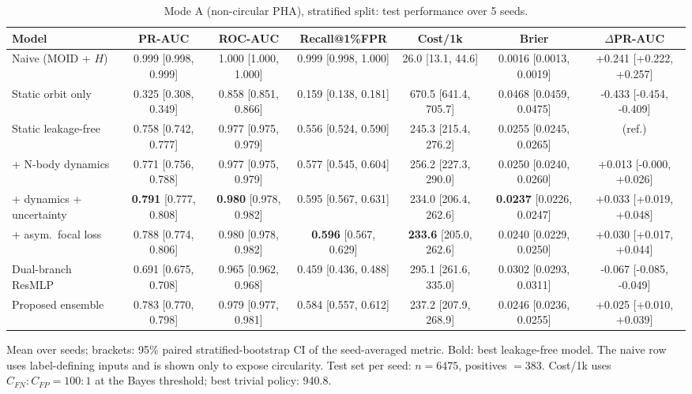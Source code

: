 \begin{table}[t]
\centering
\small
\caption{Mode A (non-circular PHA), stratified split: test performance over 5 seeds.}
\label{tab:pha_stratified_all}
\begin{tabular}{lcccccc}
\toprule
Model & PR-AUC & ROC-AUC & Recall@1\%FPR & Cost/1k & Brier & $\Delta$PR-AUC \\
\midrule
Naive (MOID + $H$) & 0.999 \scriptsize{[0.998, 0.999]} & 1.000 \scriptsize{[1.000, 1.000]} & 0.999 \scriptsize{[0.998, 1.000]} & 26.0 \scriptsize{[13.1, 44.6]} & 0.0016 \scriptsize{[0.0013, 0.0019]} & +0.241 \scriptsize{[+0.222, +0.257]} \\
\midrule
Static orbit only & 0.325 \scriptsize{[0.308, 0.349]} & 0.858 \scriptsize{[0.851, 0.866]} & 0.159 \scriptsize{[0.138, 0.181]} & 670.5 \scriptsize{[641.4, 705.7]} & 0.0468 \scriptsize{[0.0459, 0.0475]} & -0.433 \scriptsize{[-0.454, -0.409]} \\
Static leakage-free & 0.758 \scriptsize{[0.742, 0.777]} & 0.977 \scriptsize{[0.975, 0.979]} & 0.556 \scriptsize{[0.524, 0.590]} & 245.3 \scriptsize{[215.4, 276.2]} & 0.0255 \scriptsize{[0.0245, 0.0265]} & (ref.) \\
+ N-body dynamics & 0.771 \scriptsize{[0.756, 0.788]} & 0.977 \scriptsize{[0.975, 0.979]} & 0.577 \scriptsize{[0.545, 0.604]} & 256.2 \scriptsize{[227.3, 290.0]} & 0.0250 \scriptsize{[0.0240, 0.0260]} & +0.013 \scriptsize{[-0.000, +0.026]} \\
+ dynamics + uncertainty & \textbf{0.791} \scriptsize{[0.777, 0.808]} & \textbf{0.980} \scriptsize{[0.978, 0.982]} & 0.595 \scriptsize{[0.567, 0.631]} & 234.0 \scriptsize{[206.4, 262.6]} & \textbf{0.0237} \scriptsize{[0.0226, 0.0247]} & +0.033 \scriptsize{[+0.019, +0.048]} \\
+ asym.\ focal loss & 0.788 \scriptsize{[0.774, 0.806]} & 0.980 \scriptsize{[0.978, 0.982]} & \textbf{0.596} \scriptsize{[0.567, 0.629]} & \textbf{233.6} \scriptsize{[205.0, 262.6]} & 0.0240 \scriptsize{[0.0229, 0.0250]} & +0.030 \scriptsize{[+0.017, +0.044]} \\
Dual-branch ResMLP & 0.691 \scriptsize{[0.675, 0.708]} & 0.965 \scriptsize{[0.962, 0.968]} & 0.459 \scriptsize{[0.436, 0.488]} & 295.1 \scriptsize{[261.6, 335.0]} & 0.0302 \scriptsize{[0.0293, 0.0311]} & -0.067 \scriptsize{[-0.085, -0.049]} \\
Proposed ensemble & 0.783 \scriptsize{[0.770, 0.798]} & 0.979 \scriptsize{[0.977, 0.981]} & 0.584 \scriptsize{[0.557, 0.612]} & 237.2 \scriptsize{[207.9, 268.9]} & 0.0246 \scriptsize{[0.0236, 0.0255]} & +0.025 \scriptsize{[+0.010, +0.039]} \\
\bottomrule
\end{tabular}
\par\vspace{2pt}\footnotesize Mean over seeds; brackets: 95\% paired stratified-bootstrap CI of the seed-averaged metric. Bold: best leakage-free model. The naive row uses label-defining inputs and is shown only to expose circularity. Test set per seed: $n=6475$, positives $=383$. Cost/1k uses $C_{FN}{:}C_{FP}=100{:}1$ at the Bayes threshold; best trivial policy: 940.8.
\end{table}
